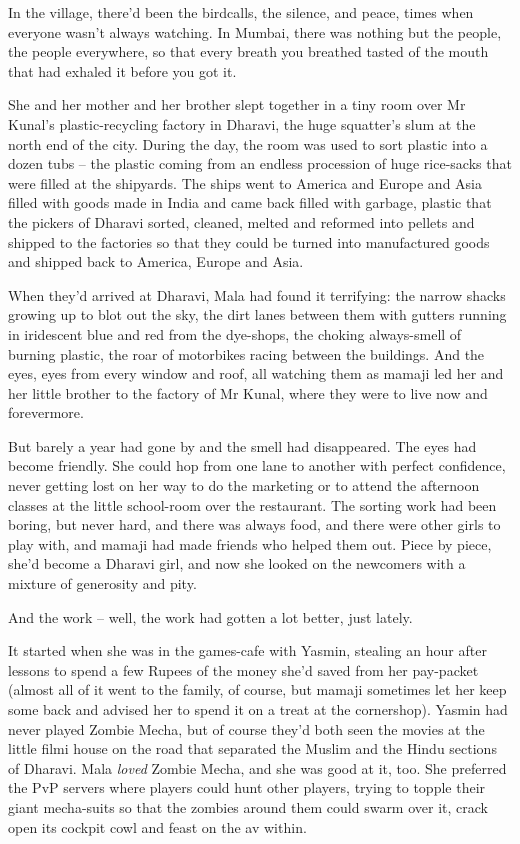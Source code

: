 In the village, there'd been the birdcalls, the silence, and peace,
times when everyone wasn't always watching. In Mumbai, there was
nothing but the people, the people everywhere, so that every breath
you breathed tasted of the mouth that had exhaled it before you got
it.

She and her mother and her brother slept together in a tiny room
over Mr Kunal's plastic-recycling factory in Dharavi, the huge
squatter's slum at the north end of the city. During the day, the
room was used to sort plastic into a dozen tubs -- the plastic
coming from an endless procession of huge rice-sacks that were
filled at the shipyards. The ships went to America and Europe and
Asia filled with goods made in India and came back filled with
garbage, plastic that the pickers of Dharavi sorted, cleaned,
melted and reformed into pellets and shipped to the factories so
that they could be turned into manufactured goods and shipped back
to America, Europe and Asia.

When they'd arrived at Dharavi, Mala had found it terrifying: the
narrow shacks growing up to blot out the sky, the dirt lanes
between them with gutters running in iridescent blue and red from
the dye-shops, the choking always-smell of burning plastic, the
roar of motorbikes racing between the buildings. And the eyes, eyes
from every window and roof, all watching them as mamaji led her and
her little brother to the factory of Mr Kunal, where they were to
live now and forevermore.

But barely a year had gone by and the smell had disappeared. The
eyes had become friendly. She could hop from one lane to another
with perfect confidence, never getting lost on her way to do the
marketing or to attend the afternoon classes at the little
school-room over the restaurant. The sorting work had been boring,
but never hard, and there was always food, and there were other
girls to play with, and mamaji had made friends who helped them
out. Piece by piece, she'd become a Dharavi girl, and now she
looked on the newcomers with a mixture of generosity and pity.

And the work -- well, the work had gotten a lot better, just
lately.

It started when she was in the games-cafe with Yasmin, stealing an
hour after lessons to spend a few Rupees of the money she'd saved
from her pay-packet (almost all of it went to the family, of
course, but mamaji sometimes let her keep some back and advised her
to spend it on a treat at the cornershop). Yasmin had never played
Zombie Mecha, but of course they'd both seen the movies at the
little filmi house on the road that separated the Muslim and the
Hindu sections of Dharavi. Mala \emph{loved} Zombie Mecha, and she
was good at it, too. She preferred the PvP servers where players
could hunt other players, trying to topple their giant mecha-suits
so that the zombies around them could swarm over it, crack open its
cockpit cowl and feast on the av within.

